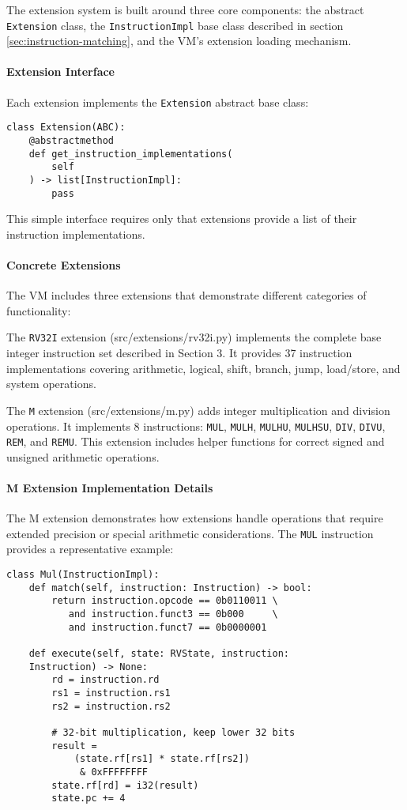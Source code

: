 \documentclass[sigconf]{acmart}
\begin{document}
The extension system is built around three core components: the abstract \texttt{Extension} class, the \texttt{InstructionImpl} base class described in section \ref{sec:instruction-matching}, and the VM's extension loading mechanism.

\paragraph{Extension Interface}
Each extension implements the \texttt{Extension} abstract base class:
\begin{verbatim}
class Extension(ABC):
    @abstractmethod
    def get_instruction_implementations(
        self
    ) -> list[InstructionImpl]:
        pass
\end{verbatim}
This simple interface requires only that extensions provide a list of their instruction implementations.

\paragraph{Concrete Extensions}
The VM includes three extensions that demonstrate different categories of functionality:

The \texttt{RV32I} extension (src/extensions/rv32i.py) implements the complete base integer instruction set described in Section 3. It provides 37 instruction implementations covering arithmetic, logical, shift, branch, jump, load/store, and system operations.

The \texttt{M} extension (src/extensions/m.py) adds integer multiplication and division operations. It implements 8 instructions: \texttt{MUL}, \texttt{MULH}, \texttt{MULHU}, \texttt{MULHSU}, \texttt{DIV}, \texttt{DIVU}, \texttt{REM}, and \texttt{REMU}. This extension includes helper functions for correct signed and unsigned arithmetic operations.

\paragraph{M Extension Implementation Details}
The M extension demonstrates how extensions handle operations that require extended precision or special arithmetic considerations. The \texttt{MUL} instruction provides a representative example:

\begin{verbatim}
class Mul(InstructionImpl):
    def match(self, instruction: Instruction) -> bool:
        return instruction.opcode == 0b0110011 \
           and instruction.funct3 == 0b000     \
           and instruction.funct7 == 0b0000001
    
    def execute(self, state: RVState, instruction: 
    Instruction) -> None:
        rd = instruction.rd
        rs1 = instruction.rs1
        rs2 = instruction.rs2
        
        # 32-bit multiplication, keep lower 32 bits
        result = 
            (state.rf[rs1] * state.rf[rs2])
             & 0xFFFFFFFF
        state.rf[rd] = i32(result)
        state.pc += 4
\end{verbatim}
\end{document}
